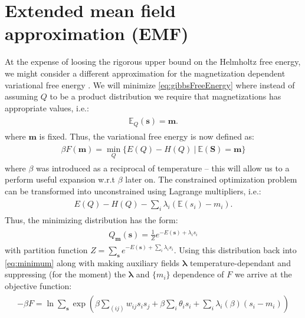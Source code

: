 \section{Extended mean field approximation (EMF)}
At the expense of loosing the rigorous upper bound on the Helmholtz free energy, we might consider a different approximation for the magnetization dependent variational free energy \cite{georges1991expand}. We will minimize \ref{eq:gibbsFreeEnergy} where instead of assuming $Q$ to be a product distribution we require that magnetizations has appropriate values, i.e.:
\begin{align}
\begin{split}
\mathbb{E}_Q (\mathbf{s}) = \mathbf{m} .
\label{eq:constraint}
\end{split}
\end{align}
 where $\mathbf{m}$ is fixed. Thus, the variational free energy is now defined as: 
 \begin{align}
\begin{split}
\beta F(\mathbf{m}) = \min_{Q} \{E(Q) - H(Q) ~|~\mathbb{E}(\mathbf{S}) = \mathbf{m} \}
\label{eq:minimum}
\end{split}
\end{align}
	where $\beta$ was introduced as a reciprocal of temperature -- this will allow us to a perform useful expansion w.r.t $\beta$ later on. The constrained optimization problem can be transformed into unconstrained using Lagrange multipliers, i.e.:
 \begin{align}
\begin{split}
E(Q) - H(Q) -  \sum_i \lambda_i(\mathbb{E}(s_i) - m_i). 
\end{split}
\end{align}
Thus, the minimizing distribution has the form:
 \begin{align}
\begin{split}
Q_{\mathbf{m}}(\mathbf{s}) = \frac{1}{Z} e^{-E(\mathbf{s}) + \lambda_i s_i}
\end{split}
\end{align}
with partition function $Z = \sum_{\mathbf{s}} e^{-E(\mathbf{s}) + \sum_i \lambda_i s_i}$. Using this distribution back into \ref{eq:minimum} along with making auxiliary fields $\mathbf{\lambda}$ temperature-dependant and suppressing (for the moment) the $\mathbf{\lambda}$ and $\{m_i \}$ dependence of $F$ we arrive at the objective function:
 \begin{align}
\begin{split} - \beta F = \ln \sum_{\mathbf{s}} \exp \left( \beta \sum_{(ij)} w_{ij} s_i s_j +\beta \sum_i  \theta_i s_i  + \sum_i \lambda_i (\beta) (s_i - m_i) \right)
\end{split}
\end{align}

